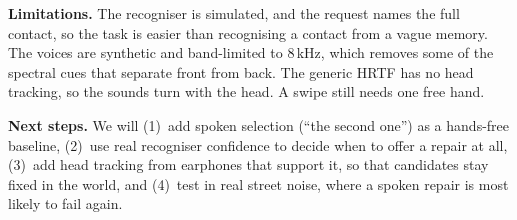 \documentclass[conference,letterpaper]{IEEEtran}
\begin{document}
\textbf{Limitations.} The recogniser is simulated, and the request names the full contact, so the
task is easier than recognising a contact from a vague memory. The voices are synthetic and band-limited
to 8\,kHz, which removes some of the spectral cues that separate front from back. The generic HRTF has
no head tracking, so the sounds turn with the head. A swipe still needs one free hand.

\textbf{Next steps.} We will (1)~add spoken selection (``the second one'') as a hands-free baseline,
(2)~use real recogniser confidence to decide when to offer a repair at all, (3)~add head tracking from
earphones that support it, so that candidates stay fixed in the world, and (4)~test in real street noise,
where a spoken repair is most likely to fail again.



\end{document}
